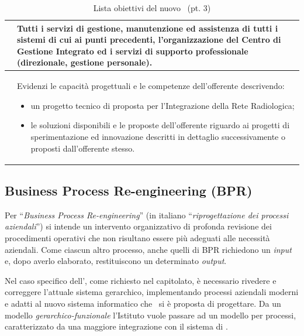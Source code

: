\begin{table}[H]
\begin{tabular}{|>{\raggedright\arraybackslash}m{2cm}|m{10cm}|}
			\codiceobiettivo & Tutti i servizi di gestione, manutenzione ed assistenza di tutti i sistemi di cui ai punti precedenti, l’organizzazione del Centro di Gestione Integrato ed i servizi di supporto professionale (direzionale, gestione personale).
			\\\hline
			
			\codiceobiettivo & Evidenzi le capacità progettuali e le competenze dell’offerente descrivendo:
			\begin{itemize}[noitemsep]
				\item un progetto tecnico di proposta per l’Integrazione della Rete Radiologica;
				\item le soluzioni disponibili e le proposte dell’offerente riguardo ai progetti di sperimentazione ed innovazione descritti in dettaglio successivamente o proposti dall’offerente stesso.
			\end{itemize}
			\\\hline
	
		\end{tabular}
		\renewcommand\arraystretch{1}
		\caption{Lista obiettivi del nuovo \helpdesk~(pt. 3)}
	\end{table}	

	\newpage
	\subsection{Business Process Re-engineering (BPR)}\label{sec:desc_bpr}
		
		Per ``\textit{Business Process Re-engineering}'' (in italiano ``\textit{riprogettazione dei processi aziendali}'') si intende un intervento organizzativo di profonda revisione dei procedimenti operativi che non risultano essere più adeguati alle necessità aziendali.
		Come ciascun altro processo, anche quelli di BPR richiedono un \textit{input} e, dopo averlo elaborato, restituiscono un determinato \textit{output}.
		
		Nel caso specifico dell'\istituto, come richiesto nel capitolato, è necessario rivedere e correggere l'attuale sistema gerarchico, implementando processi aziendali moderni e adatti al nuovo sistema informatico che \azienda~si è proposta di progettare.
		Da un modello \textit{gerarchico-funzionale} l'Istituto vuole passare ad un modello per processi, caratterizzato da una maggiore integrazione con il sistema di \helpdesk.
	
